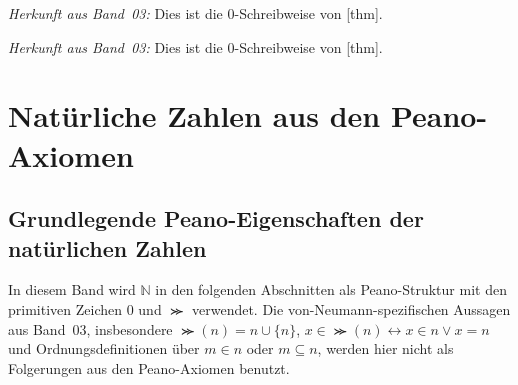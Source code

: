 \documentclass[main.tex]{subfiles}
\begin{document}
\par\noindent\emph{Herkunft aus Band~03:} Dies ist die \(0\)-Schreibweise von
[thm].\par

\par\noindent\emph{Herkunft aus Band~03:} Dies ist die \(0\)-Schreibweise von
[thm].\par

\chapter{Natürliche Zahlen aus den Peano-Axiomen}

\section{Grundlegende Peano-Eigenschaften der natürlichen Zahlen}

In diesem Band wird \(\mathbb{N}\) in den folgenden Abschnitten als
Peano-Struktur mit den primitiven Zeichen \(0\) und \(\Succ\) verwendet. Die
von-Neumann-spezifischen Aussagen aus Band~03, insbesondere
\(\Succ(n)=n\cup\{n\}\), \(x\in\Succ(n)\leftrightarrow x\in n\lor x=n\) und
Ordnungsdefinitionen über \(m\in n\) oder \(m\subseteq n\), werden hier nicht
als Folgerungen aus den Peano-Axiomen benutzt.

\begin{tabproof}
\end{tabproof}

\begin{tabproof}
\end{tabproof}
\end{document}
